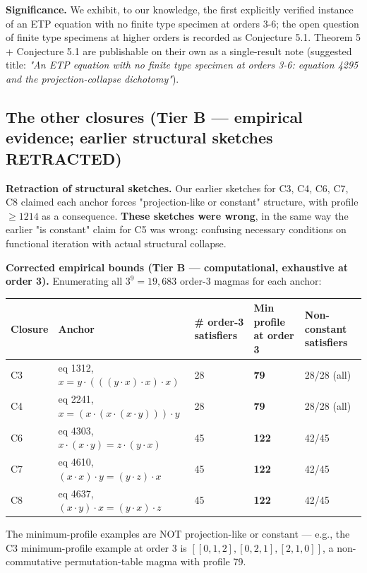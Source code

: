 \documentclass[11pt,reqno]{amsart}
\theoremstyle{plain}
\theoremstyle{definition}
\begin{document}
\textbf{Significance.} We exhibit, to our knowledge, the first explicitly verified instance of an ETP equation with no finite type specimen at orders 3-6; the open question of finite type specimens at higher orders is recorded as Conjecture 5.1. Theorem 5 + Conjecture 5.1 are publishable on their own as a single-result note (suggested title: \textit{"An ETP equation with no finite type specimen at orders 3-6: equation 4295 and the projection-collapse dichotomy"}).

\subsection{The other closures (Tier B --- empirical evidence; earlier structural sketches RETRACTED)}

\textbf{Retraction of structural sketches.} Our earlier sketches for C3, C4, C6, C7, C8 claimed each anchor forces "projection-like or constant" structure, with profile $\geq 1214$ as a consequence. \textbf{These sketches were wrong}, in the same way the earlier "is constant" claim for C5 was wrong: confusing necessary conditions on functional iteration with actual structural collapse.

\textbf{Corrected empirical bounds (Tier B --- computational, exhaustive at order 3).} Enumerating all $3^9 = 19{,}683$ order-3 magmas for each anchor:

\begin{center}
\begin{tabular}{lllll}
\toprule
Closure & Anchor & # order-3 satisfiers & Min profile at order 3 & Non-constant satisfiers \\
\midrule
C3 & eq 1312, $x = y \cdot (((y \cdot x) \cdot x) \cdot x)$ & 28 & \textbf{79} & 28/28 (all) \\
C4 & eq 2241, $x = (x \cdot (x \cdot (x \cdot y))) \cdot y$ & 28 & \textbf{79} & 28/28 (all) \\
C6 & eq 4303, $x \cdot (x \cdot y) = z \cdot (y \cdot x)$ & 45 & \textbf{122} & 42/45 \\
C7 & eq 4610, $(x \cdot x) \cdot y = (y \cdot z) \cdot x$ & 45 & \textbf{122} & 42/45 \\
C8 & eq 4637, $(x \cdot y) \cdot x = (y \cdot x) \cdot z$ & 45 & \textbf{122} & 42/45 \\
\bottomrule
\end{tabular}
\end{center}

The minimum-profile examples are NOT projection-like or constant --- e.g., the C3 minimum-profile example at order 3 is $[[0, 1, 2], [0, 2, 1], [2, 1, 0]]$, a non-commutative permutation-table magma with profile 79.
\end{document}
